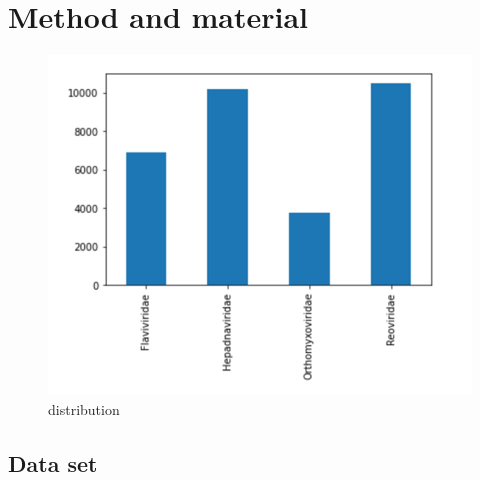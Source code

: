 \section {Method and material}

\begin{figure}[t]
	\begin{centering}
		\includegraphics[width=.48\textwidth]{Figures/dist.png}
	\caption{distribution  }
\label{fig:distr}
\end{centering}
\end{figure}

\subsection{Data set}
\label{sec:obj:det}

